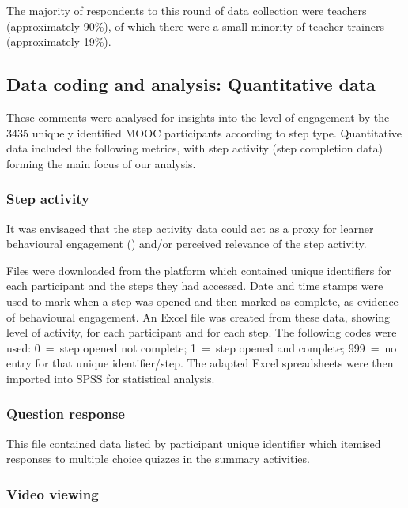 \documentclass[output=paper]{langscibook}
\begin{document}
The majority of respondents to this round of data collection were teachers (approximately 90\%), of which there were a small minority of teacher trainers (approximately 19\%).

\subsection{Data coding and analysis: Quantitative data}\label{sec:porter:2.4}

These comments were analysed for insights into the level of engagement by the 3435 uniquely identified MOOC participants according to step type. Quantitative data included the following metrics, with step activity (step completion data) forming the main focus of our analysis.

\subsubsection{Step activity}\label{sec:porter:2.4.1}

It was envisaged that the step activity data could act as a proxy for learner behavioural engagement (\citealt{FredricksEtAl2004,GobertEtAl2015}) and/or perceived relevance of the step activity.

Files were downloaded from the platform which contained unique identifiers for each participant and the steps they had accessed. Date and time stamps were used to mark when a step was opened and then marked as complete, as evidence of behavioural engagement. An Excel file was created from these data, showing level of activity, for each participant and for each step. The following codes were used: 0~=~step opened not complete; 1~=~step opened and complete; 999~=~no entry for that unique identifier/step. The adapted Excel spreadsheets were then imported into SPSS for statistical analysis.

\subsubsection{Question response}\label{sec:porter:2.4.2}

This file contained data listed by participant unique identifier which itemised responses to multiple choice quizzes in the summary activities.

\subsubsection{Video viewing}\label{sec:porter:2.4.3}
\end{document}
